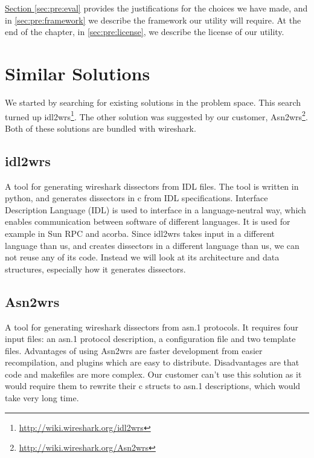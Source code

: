 \hyperref[sec:pre:eval]{Section \ref*{sec:pre:eval}} provides the
justifications for the choices we have made, and in
\autoref{sec:pre:framework} we describe the framework our \gls{utility} will require.
At the end of the chapter, in \autoref{sec:pre:license}, we describe the
license of our \gls{utility}.


\section{Similar Solutions}
\label{sec:pre:similar}
We started by searching for existing solutions in the problem space. This
search turned up idl2wrs\footnote{\url{http://wiki.wireshark.org/idl2wrs}}.
The other solution was suggested by our customer,
Asn2wrs\footnote{\url{http://wiki.wireshark.org/Asn2wrs}}.
Both of these solutions are bundled with \Gls{wireshark}.

\subsection{idl2wrs}
A tool for generating \Gls{wireshark} \glspl{dissector} from IDL files. The tool is written
in \Gls{python}, and generates \glspl{dissector} in \Gls{c} from IDL specifications. Interface
Description Language (IDL) is used to interface in a language-neutral way,
which enables communication between software of different languages. It is
used for example in \Gls{Sun RPC} and \Gls{acorba}. Since idl2wrs takes input in a different
language than us, and creates \glspl{dissector} in a different language than us, we
can not reuse any of its code. Instead we will look at its architecture and
data structures, especially how it generates \glspl{dissector}.

\subsection{Asn2wrs}
A tool for generating \Gls{wireshark} \glspl{dissector} from \Gls{asn.1} \glspl{protocol}. It requires
four input files: an \Gls{asn.1} \gls{protocol} description, a configuration file and two
template files. Advantages of using Asn2wrs are faster development from
easier recompilation, and plugins which are easy to distribute. Disadvantages
are that code and \glspl{makefile} are more complex. Our customer can't use this
solution as it would require them to rewrite their \Gls{c} \glspl{struct} to \Gls{asn.1}
descriptions, which would take very long time.


